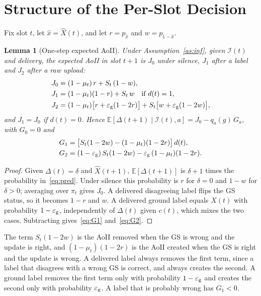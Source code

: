 \documentclass[conference]{IEEEtran}
\newtheorem{lemma}{Lemma}
\theoremstyle{remark}
\newcommand{\E}{\mathbb{E}}
\newcommand{\I}{\mathcal{I}}
\newcommand{\ee}{\varepsilon}
\newcommand{\xh}{\hat{x}}
\begin{document}
\section{Structure of the Per-Slot Decision}\label{sec:structure}
Fix slot $t$, let $\xh=\hat X(t)$, and let $r=p_{\xh}$ and $w=p_{1-\xh}$.

\begin{lemma}[One-step expected AoII]\label{lem:onestep}
Under Assumption~\ref{as:inf}, given $\I(t)$ and delivery, the expected AoII in slot $t+1$ is $J_0$ under silence, $J_1$ after a label and $J_2$ after a raw upload:
\begin{align*}
J_0&=(1-\mu_t)\,r+S_t\,(1-w),\\
J_1&=(1-\mu_t)(1-r)+S_t\,w\quad\text{if } d(t)=1,\\
J_2&=(1-\mu_t)\big[r+\ee_{\rm g}(1-2r)\big]+S_t\big[w+\ee_{\rm g}(1-2w)\big],
\end{align*}
and $J_1=J_0$ if $d(t)=0$. Hence $\E[\Delta(t+1)\mid\I(t),a]=J_0-q_a(g)\,G_a$, with $G_0=0$ and
\begin{align}
G_1&=\big[S_t(1-2w)-(1-\mu_t)(1-2r)\big]\,d(t), \label{eq:G1}\\
G_2&=(1-\ee_{\rm g})\,S_t(1-2w)-\ee_{\rm g}\,(1-\mu_t)(1-2r). \label{eq:G2}
\end{align}
\end{lemma}
\begin{proof}
Given $\Delta(t)=\delta$ and $\hat X(t+1)$, $\E[\Delta(t+1)]$ is $\delta+1$ times the probability in~\eqref{eq:pred}. Under silence this probability is $r$ for $\delta=0$ and $1-w$ for $\delta>0$; averaging over $\pi_t$ gives $J_0$. A delivered disagreeing label flips the GS status, so it becomes $1-r$ and $w$. A delivered ground label equals $X(t)$ with probability $1-\ee_{\rm g}$, independently of $\Delta(t)$ given $c(t)$, which mixes the two cases. Subtracting gives~\eqref{eq:G1} and~\eqref{eq:G2}.
\end{proof}

The term $S_t(1-2w)$ is the AoII removed when the GS is wrong and the update is right, and $(1-\mu_t)(1-2r)$ is the AoII created when the GS is right and the update is wrong. A delivered label always removes the first term, since a label that disagrees with a wrong GS is correct, and always creates the second. A ground label removes the first term only with probability $1-\ee_{\rm g}$ and creates the second only with probability $\ee_{\rm g}$. A label that is probably wrong has $G_1<0$.
\end{document}
